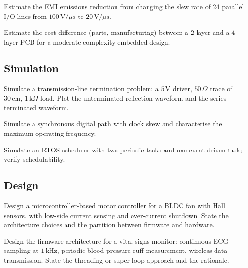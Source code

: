\begin{exercise}
Estimate the EMI emissions reduction from changing the slew rate of $24$ parallel I/O lines from $100\,\text{V}/\mu\text{s}$ to $20\,\text{V}/\mu\text{s}$.
\end{exercise}

\begin{exercise}
Estimate the cost difference (parts, manufacturing) between a $2$-layer and a $4$-layer PCB for a moderate-complexity embedded design.
\end{exercise}

\subsection*{Simulation}

\begin{exercise}
Simulate a transmission-line termination problem: a $5\,\text{V}$ driver, $50\,\Omega$ trace of $30\,\text{cm}$, $1\,\text{k}\Omega$ load. Plot the unterminated reflection waveform and the series-terminated waveform.
\end{exercise}

\begin{exercise}
Simulate a synchronous digital path with clock skew and characterise the maximum operating frequency.
\end{exercise}

\begin{exercise}
Simulate an RTOS scheduler with two periodic tasks and one event-driven task; verify schedulability.
\end{exercise}

\subsection*{Design}

\begin{exercise}
Design a microcontroller-based motor controller for a BLDC fan with Hall sensors, with low-side current sensing and over-current shutdown. State the architecture choices and the partition between firmware and hardware.
\end{exercise}

\begin{exercise}
Design the firmware architecture for a vital-signs monitor: continuous ECG sampling at $1\,\text{kHz}$, periodic blood-pressure cuff measurement, wireless data transmission. State the threading or super-loop approach and the rationale.
\end{exercise}

